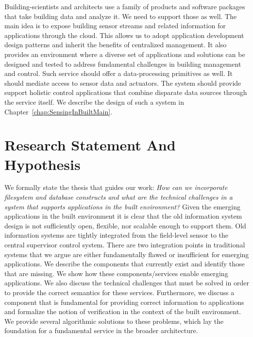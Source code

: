 Building-scientists and architects use a family of products and software packages that take building data 
and analyze it.  We need to support those as well.  The main idea is to expose building sensor streams and related information for 
applications through the cloud.  This allows us to adopt application development design patterns and inherit the benefits of 
centralized management.   It also provides an environment where a diverse set of applications and solutions can be designed
and tested to address fundamental challenges in building management and control.  %
Such service should offer a data-processing primitives as well.   It should mediate access to sensor data and actuators.
The system should provide support holistic control applications that combine disparate data sources through the service itself.
We describe the design of such a system in Chapter~\ref{chap:SensingInBuiltMain}.


\section{Research Statement And Hypothesis}
We formally state the thesis that guides our work: %
\emph{How can we incorporate filesystem and database constructs and what are the technical challenges in a system that supports applications
in the built environment?}
Given the emerging applications in
the built environment it is clear that the old information system design is not sufficiently open, flexible, nor
scalable enough to support them.  Old information systems are tightly integrated from the field-level sensor to
the central supervisor control system.  There are two integration points in traditional systems that we argue 
are either fundamentally flawed or insufficient for emerging applications.  We describe the components that 
currently exist and identify those that are missing.  We show how these components/services enable emerging applications.  We also
discuss the technical challenges that must be solved in order to provide the correct semantics for these services.
Furthermore, we discuss a component that is fundamental for providing correct information to applications 
and formalize the notion of verification in the context of the built environment.  We provide several algorithmic 
solutions to these problems, which lay the foundation for a fundamental service in the broader architecture.


